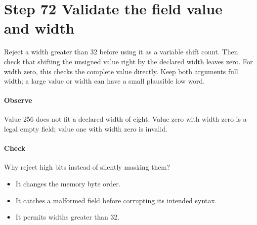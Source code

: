\section{Step 72 Validate the field value and width}\label{h263-writer-s02}
Reject a width greater than 32 before using it as a variable shift count. Then
check that shifting the unsigned value right by the declared width leaves zero.
For width zero, this checks the complete value directly. Keep both arguments
full width; a large value or width can have a small plausible low word.

\paragraph{Observe} Value 256 does not fit a declared width of eight. Value zero
with width zero is a legal empty field; value one with width zero is invalid.
\paragraph{Check} Why reject high bits instead of silently masking them?
\begin{itemize}
  \item[A.] It changes the memory byte order.
  \item[B.] It catches a malformed field before corrupting its intended syntax.
  \item[C.] It permits widths greater than 32.
\end{itemize}
